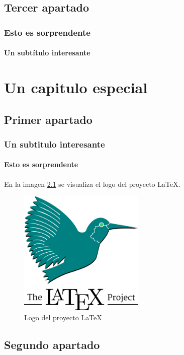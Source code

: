 \documentclass[12pt]{report}
\begin{document}
\section{Tercer apartado}
\subsection{Esto es sorprendente}
\lipsum[3-4]
\subsubsection{Un subtítulo interesante}
\lipsum[5-7]

\chapter{Un capitulo especial}
\section{Primer apartado}
   \lipsum[4-5]
\subsection{Un subtitulo interesante}
   \lipsum[6]
\subsubsection{Esto es sorprendente}
   \lipsum[2-3]
   En la imagen \ref{fig:proyecto_dos} se visualiza el logo del proyecto \LaTeX.

\begin{figure}[ht]
   \centering
   \includegraphics[width=6cm]{latex.png}
   \caption{Logo del proyecto \LaTeX}
   \label{fig:proyecto_dos}
\end{figure}
\section{Segundo apartado}
   \lipsum[1]
\end{document}

